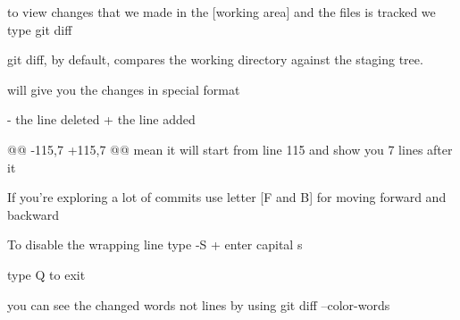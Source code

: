 to view changes that we made in the [working area] and the files is tracked we type 
  git diff 

git diff, by default, compares the working directory against the staging tree.

will give you the changes in special format 

- the line deleted 
+ the line added 

@@ -115,7 +115,7 @@ 
mean it will start from line 115 and show you 7 lines after it 

If you're exploring a lot of commits use letter [F and B] for moving forward and backward

To disable the wrapping line type 
-S  + enter  capital s 

type Q  to exit 


you can see the changed words not lines by using 
  git diff --color-words
